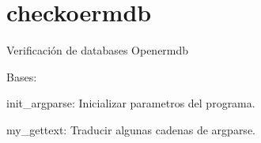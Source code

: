 \documentclass[a4paper,12pt,spanish]{sphinxmanual}
\begin{document}
\label{\detokenize{checkoermdb:checkoermdb}}\label{\detokenize{checkoermdb:module-checkoermdb}}\label{\detokenize{checkoermdb:checkoermdb}}

\section{checkoermdb}
\label{\detokenize{checkoermdb:id1}}\label{\detokenize{checkoermdb::doc}}
Verificación de databases Openermdb

\begin{fulllineitems}
\label{\detokenize{checkoermdb:checkoermdb.OermDataBase}}
Bases: 

\end{fulllineitems}


\begin{fulllineitems}
\label{\detokenize{checkoermdb:checkoermdb.init_argparse}}
init\_argparse: Inicializar parametros del programa.

\end{fulllineitems}


\begin{fulllineitems}
\label{\detokenize{checkoermdb:checkoermdb.my_gettext}}
my\_gettext: Traducir algunas cadenas de argparse.

\end{fulllineitems}
\end{document}
